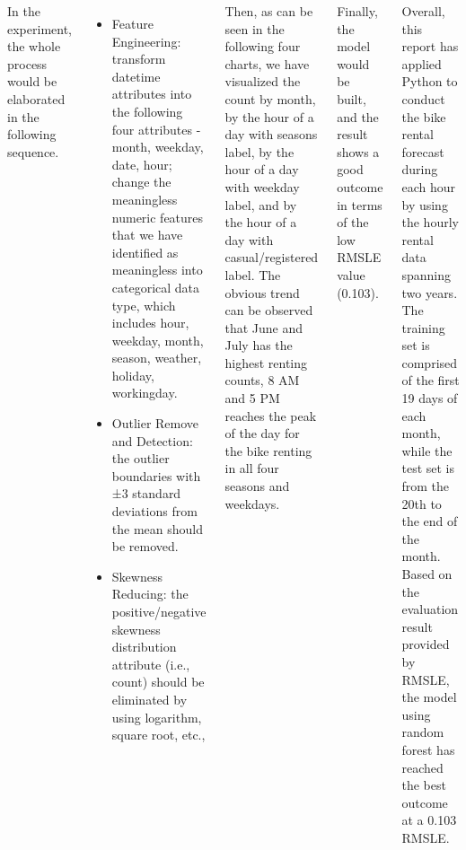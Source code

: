 \documentclass{tikzposter} %
\begin{document}
\begin{columns}
{
In the experiment, the whole process would be elaborated in the following sequence.
\begin{itemize}
    \item Feature Engineering: transform datetime attributes into the following four attributes - month, weekday, date, hour; change the meaningless numeric features that we have identified as meaningless into categorical data type, which includes hour, weekday, month, season, weather, holiday, workingday.
    \item Outlier Remove and Detection: the outlier boundaries with ±3 standard deviations from the mean should be removed.
    \item Skewness Reducing: the positive/negative skewness distribution attribute (i.e., count) should be eliminated by using logarithm, square root, etc.,
\end{itemize}

Then, as can be seen in the following four charts, we have visualized the count by month, by the hour of a day with seasons label, by the hour of a day with weekday label, and by the hour of a day with casual/registered label. The obvious trend can be observed that June and July has the highest renting counts, 8 AM and 5 PM reaches the peak of the day for the bike renting in all four seasons and weekdays.

Finally, the model would be built, and the result shows a good outcome in terms of the low RMSLE value (0.103).
}


{
\begin{description}
Overall, this report has applied Python to conduct the bike rental forecast during each hour by using the hourly rental data spanning two years. The training set is comprised of the first 19 days of each month, while the test set is from the 20th to the end of the month. Based on the evaluation result provided by RMSLE, the model using random forest has reached the best outcome at a 0.103 RMSLE.

\end{description}
}
\end{columns}


\end{document}

